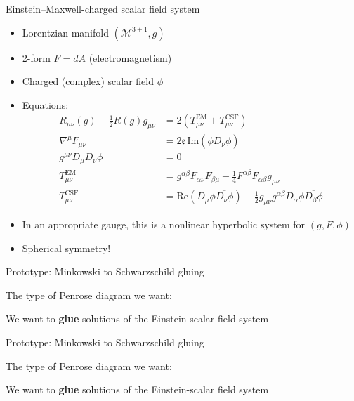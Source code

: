 \documentclass[compress,usenames,dvipsnames,8pt]{beamer}
\theoremstyle{definition}
\renewcommand{\(}{\begin{columns}}
\renewcommand{\)}{\end{columns}}
\newcommand{\<}[1]{\begin{column}{#1}}
\renewcommand{\>}{\end{column}}
\begin{document}
\begin{frame}{Einstein--Maxwell-charged scalar field system}

\begin{itemize}
\item  Lorentzian manifold $(\mathcal M^{3+1},g)$
\item 2-form $F=dA$ (electromagnetism) 
\item Charged (complex) scalar field $\phi$ \pause
\item Equations: \begin{align}
    R_{\mu\nu}(g)-\tfrac 12 R(g)g_{\mu\nu}&= 2\left(  T^\mathrm{EM}_{\mu\nu}+  T^\mathrm{CSF}_{\mu\nu}\right)\\
    \nabla^\mu F_{\mu\nu}&= 2\mathfrak e\, \mathrm{Im}(\phi\overline{D_\nu \phi})\\
    g^{\mu\nu}D_\mu D_\nu \phi&=0\\
    T^\mathrm{EM}_{\mu \nu}&= g^{\alpha \beta}F _{\alpha \nu}F_{\beta \mu }-\tfrac{1}{4}F^{\alpha \beta}F_{\alpha \beta}g_{\mu \nu}\\
  T^\mathrm{CSF}_{\mu \nu}&= \mathrm{Re}(D _{\mu}\phi \overline{D _{\nu}\phi}) -\tfrac{1}{2}g_{\mu \nu} g^{\alpha \beta} D _{\alpha}\phi \overline{D _{\beta}\phi}
\end{align}
\item In an appropriate gauge, this is a nonlinear hyperbolic system for $(g,F,\phi)$ \pause

\item Spherical symmetry!
\end{itemize}

\end{frame}




\begin{frame}{Prototype: Minkowski to Schwarzschild gluing}

The type of Penrose diagram we want:

\begin{figure}
 \def\svgwidth{20pc}

\end{figure}

We want to {\bf{glue}} solutions of the Einstein-scalar field system

\end{frame}

\begin{frame}{Prototype: Minkowski to Schwarzschild gluing}

The type of Penrose diagram we want:

\addtocounter{framenumber}{-1}
\begin{figure}
 \def\svgwidth{20pc}

\end{figure}

We want to {\bf{glue}} solutions of the Einstein-scalar field system


\end{frame}
\end{document}
